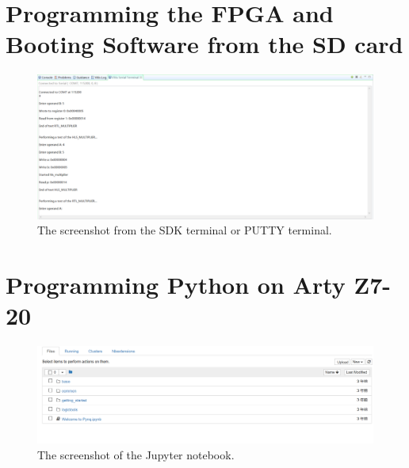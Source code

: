 \documentclass[a4paper]{article}
\begin{document}
\section{Programming the FPGA and Booting Software from the SD card}
\begin{figure}[H]
    \centering
    \includegraphics[width=1\textwidth]{10.png}
    \caption{The screenshot from the SDK terminal or PUTTY terminal.}
\end{figure}
\section{Programming Python on Arty Z7-20}
\begin{figure}[H]
    \centering
    \includegraphics[width=1\textwidth]{11.png}
    \caption{The screenshot of the Jupyter notebook.}
\end{figure}
\end{document}
